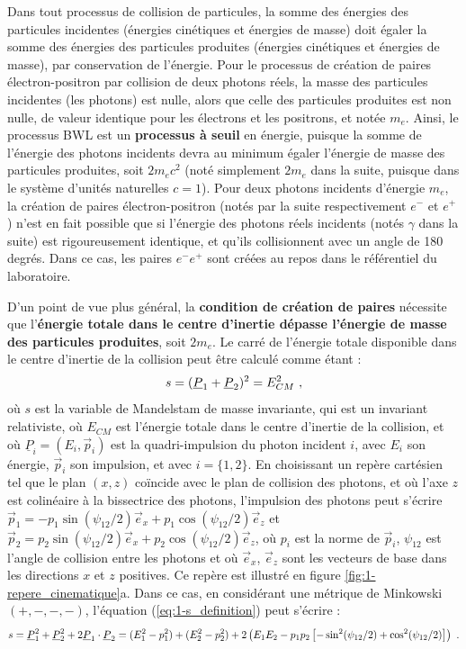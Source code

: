 \begin{refsection}
Dans tout processus de collision de particules, la somme des énergies des particules incidentes (énergies cinétiques et énergies de masse) doit égaler la somme des énergies des particules produites (énergies cinétiques et énergies de masse), par conservation de l'énergie. Pour le processus de création de paires électron-positron par collision de deux photons réels, la masse des particules incidentes (les photons) est nulle, alors que celle des particules produites est non nulle, de valeur identique pour les électrons et les positrons, et notée $m_e$. Ainsi, le processus BWL est un \textbf{processus à seuil} en énergie, puisque la somme de l'énergie des photons incidents devra au minimum égaler l'énergie de masse des particules produites, soit $2 m_e c^2$ (noté simplement $2 m_e$ dans la suite, puisque dans le système d'unités naturelles $c=1$). Pour deux photons incidents d'énergie $m_e$, la création de paires électron-positron (notés par la suite respectivement $e^-$ et $e^+$) n'est en fait possible que si l'énergie des photons réels incidents (notés $\gamma$ dans la suite) est rigoureusement identique, et qu'ils collisionnent avec un angle de 180 degrés. Dans ce cas, les paires $e^- e^+$ sont créées au repos dans le référentiel du laboratoire.

D'un point de vue plus général, la \textbf{condition de création de paires} nécessite que l'\textbf{énergie totale dans le centre d'inertie dépasse l'énergie de masse des particules produites}, soit $2 m_e$. Le carré de l'énergie totale disponible dans le centre d'inertie de la collision peut être calculé comme étant :
\begin{equation}
    s = (\underline{P}_1+\underline{P}_2)^2 = E_{CM}^2 ~ \rm ,
    \label{eq:1-s_definition}
\end{equation}
où $s$ est la variable de Mandelstam de masse invariante, qui est un invariant relativiste, où $E_{CM}$ est l'énergie totale dans le centre d'inertie de la collision, et où $\underline{P}_i=(E_i, \vec{p}_i)$ est la quadri-impulsion du photon incident $i$, avec $E_i$ son énergie, $\vec{p}_i$ son impulsion, et avec $i=\{1,2\}$. En choisissant un repère cartésien tel que le plan $(x,z)$ coïncide avec le plan de collision des photons, et où l'axe $z$ est colinéaire à la bissectrice des photons, l'impulsion des photons peut s'écrire $\vec{p}_1= - p_1 \sin(\psi_{12}/2) \vec{e}_x + p_1 \cos(\psi_{12}/2) \vec{e}_z$ et $\vec{p}_2=p_2 \sin(\psi_{12}/2) \vec{e}_x + p_2 \cos(\psi_{12}/2) \vec{e}_z$, où $p_i$ est la norme de $\vec{p}_i$, $\psi_{12}$ est l'angle de collision entre les photons et où $\vec{e}_x$, $\vec{e}_z$ sont les vecteurs de base dans les directions $x$ et $z$ positives. Ce repère est illustré en figure \ref{fig:1-repere_cinematique}a. Dans ce cas, en considérant une métrique de Minkowski $(+,-,-,-)$, l'équation (\ref{eq:1-s_definition}) peut s'écrire :
\begin{equation}
    s = \underline{P}_1^2+\underline{P}_2^2+2\underline{P}_1\cdot\underline{P}_2 = (E_1^2-p_1^2)+(E_2^2-p_2^2)+2\left(E_1 E_2-p_1 p_2 \left[-\sin^2(\psi_{12}/2)+\cos^2(\psi_{12}/2)\right]\right) ~ \rm .
\end{equation}


\end{refsection}
